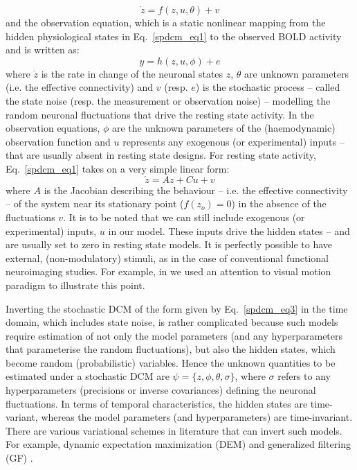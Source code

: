 \begin{equation}\label{spdcm_eq1}
\dot{z}= f(z,u,\theta)+ v
\end{equation}
and the observation equation, which is a static nonlinear mapping from the hidden physiological states in Eq.~\ref{spdcm_eq1} to the observed BOLD activity and is written as:
\begin{equation}\label{spdcm_eq2}
y= h(z,u,\phi)+ e
\end{equation}
where $\dot{z}$ is the rate in change of the neuronal states $z$, $\theta$ are unknown parameters (i.e. the effective connectivity) and $v$ (resp. $e$) is the stochastic process -- called the state noise (resp. the measurement or observation noise) -- modelling the random neuronal fluctuations that drive the resting state activity.  In the observation equations, $\phi$ are the unknown parameters of the (haemodynamic) observation function and $u$ represents any exogenous (or experimental) inputs -- that are usually absent in resting state designs. For resting state activity, Eq.~\ref{spdcm_eq1} takes on a very simple linear form:
\begin{equation}\label{spdcm_eq3}
\dot{z}= Az + Cu + v
\end{equation}
where $A$ is the Jacobian describing the behaviour -- i.e. the effective connectivity -- of the system near its stationary point ($f(z_{o})=0$) in the absence of the fluctuations $v$. It is to be noted that we can still include exogenous (or experimental) inputs, $u$  in our model. These inputs drive the hidden states -- and are usually set to zero in resting state models. It is perfectly possible to have external, (non-modulatory) stimuli, as in the case of conventional functional neuroimaging studies. For example, in \cite{dcm} we used an attention to visual motion paradigm to illustrate this point.

Inverting the stochastic DCM of the form given by Eq.~\ref{spdcm_eq3} in the time domain, which includes state noise, is rather complicated because such models require estimation of not only the model parameters (and any hyperparameters that parameterise the random fluctuations), but also the hidden states, which become random (probabilistic) variables. Hence the unknown quantities to be estimated under a stochastic DCM are  $\psi=\{z,\phi,\theta,\sigma\}$, where $\sigma$ refers to any hyperparameters (precisions or inverse covariances) defining the neuronal fluctuations. In terms of temporal characteristics, the hidden states are time-variant, whereas the model parameters (and hyperparameters) are time-invariant. There are various variational schemes in literature that can invert such models. For example, dynamic expectation maximization (DEM) \cite{FristonDEM2008} and generalized filtering (GF) \cite{FristonGenFilt2010}.

